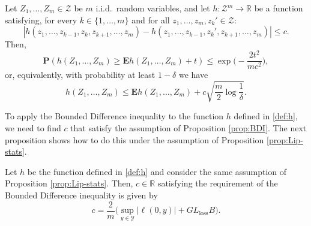 \begin{proposition}
\label{prop:BDI}
Let $Z_1,\ldots,Z_m\in\mathcal{Z}$ be $m$ i.i.d.\ random variables, and let $h:\mathcal{Z}^m\rightarrow\mathbb{R}$ be a function satisfying, for every $k\in\{1,\ldots,m\}$ and for all $z_1,\ldots,z_m,z_k'\in\mathcal{Z}$:
$$
	| h(z_1,\ldots,z_{k-1},z_k,z_{k+1},\ldots,z_m) - h(z_1,\ldots,z_{k-1},z_k',z_{k+1},\ldots,z_m) | \le c.
$$
Then,
$$
	\mathbf{P}(h(Z_1,\ldots,Z_m) \ge \mathbf{E}h(Z_1,\ldots,Z_m) + t ) \le \exp\bigg(-\frac{2t^2}{m c^2}\bigg),
$$
or, equivalently, with probability at least $1-\delta$ we have
$$
	h(Z_1,\ldots,Z_m) \le \mathbf{E}h(Z_1,\ldots,Z_m) + c\sqrt{\frac{m}{2}\log\frac{1}{\delta}}.
$$
\end{proposition}
To apply the Bounded Difference inequality to the function $h$ defined in \eqref{def:h}, we need to find $c$ that satisfy the assumption of Proposition \ref{prop:BDI}. The next proposition shows how to do this under the assumption of Proposition \ref{prop:Lip-stats}.
\begin{proposition}
\label{prop:c}
Let $h$ be the function defined in \eqref{def:h} and consider the same assumption of Proposition \ref{prop:Lip-stats}. Then, $c\in\mathbb{R}$ satisfying the requirement of the Bounded Difference inequality is given by
$$
	c = \frac{2}{m} \bigg(\sup_{y\in\mathcal{Y}} | \ell(0,y) | + GL_\textrm{loss}B \bigg).
$$
\end{proposition}

